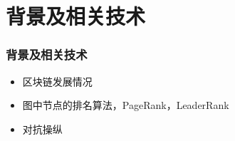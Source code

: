 
\section{背景及相关技术}
\begin{frame}
	\frametitle{背景及相关技术}
  \begin{itemize}[<+->]
  \item 区块链发展情况
  \item 图中节点的排名算法，PageRank，LeaderRank
  \item 对抗操纵
  \end{itemize}
\end{frame}

